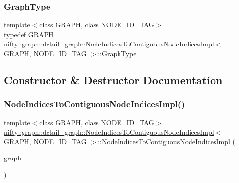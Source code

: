 \subsubsection{\texorpdfstring{Graph\+Type}{GraphType}}
{\footnotesize\ttfamily template$<$class G\+R\+A\+PH, class N\+O\+D\+E\+\_\+\+I\+D\+\_\+\+T\+AG$>$ \\
typedef G\+R\+A\+PH \hyperlink{classnifty_1_1graph_1_1detail__graph_1_1NodeIndicesToContiguousNodeIndicesImpl}{nifty\+::graph\+::detail\+\_\+graph\+::\+Node\+Indices\+To\+Contiguous\+Node\+Indices\+Impl}$<$ G\+R\+A\+PH, N\+O\+D\+E\+\_\+\+I\+D\+\_\+\+T\+AG $>$\+::\hyperlink{classnifty_1_1graph_1_1detail__graph_1_1NodeIndicesToContiguousNodeIndicesImpl_ad59d071f31d84046a821f0ddb406c21e}{Graph\+Type}}



\subsection{Constructor \& Destructor Documentation}
\mbox{\label{classnifty_1_1graph_1_1detail__graph_1_1NodeIndicesToContiguousNodeIndicesImpl_a11cb2c2e77e50dab32081e1b42e0a6b4}} 
\subsubsection{\texorpdfstring{Node\+Indices\+To\+Contiguous\+Node\+Indices\+Impl()}{NodeIndicesToContiguousNodeIndicesImpl()}}
{\footnotesize\ttfamily template$<$class G\+R\+A\+PH, class N\+O\+D\+E\+\_\+\+I\+D\+\_\+\+T\+AG$>$ \\
\hyperlink{classnifty_1_1graph_1_1detail__graph_1_1NodeIndicesToContiguousNodeIndicesImpl}{nifty\+::graph\+::detail\+\_\+graph\+::\+Node\+Indices\+To\+Contiguous\+Node\+Indices\+Impl}$<$ G\+R\+A\+PH, N\+O\+D\+E\+\_\+\+I\+D\+\_\+\+T\+AG $>$\+::\hyperlink{classnifty_1_1graph_1_1detail__graph_1_1NodeIndicesToContiguousNodeIndicesImpl}{Node\+Indices\+To\+Contiguous\+Node\+Indices\+Impl} (\begin{DoxyParamCaption}\item[{const \hyperlink{classnifty_1_1graph_1_1detail__graph_1_1NodeIndicesToContiguousNodeIndicesImpl_ad59d071f31d84046a821f0ddb406c21e}{Graph\+Type} \&}]{graph }\end{DoxyParamCaption})\hspace{0.3cm}{\ttfamily [inline]}}



